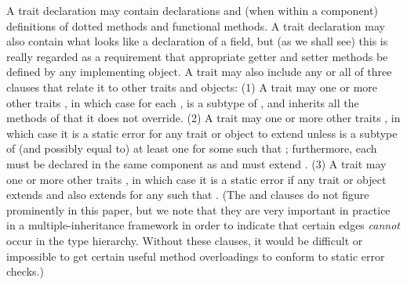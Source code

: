 A trait declaration may contain declarations and (when within a component) definitions
of dotted methods and functional methods.  A trait declaration may also contain what looks
like a declaration of a field, but (as we shall see) this is really regarded as a requirement
that appropriate getter and setter methods be defined by any implementing object.
A trait may also include any or all of three clauses that relate it to other traits and objects:
(1) A trait  may  one or more other traits , in which case
for each ,  is a subtype of , and  inherits all the methods of  that it does not override.
(2) A trait  may  one or more other traits , in which case
it is a static error for any trait or object  to extend  unless  is a subtype of (and possibly equal to) at least one 
for some  such that ; furthermore, each  must be declared in the same component as 
and must extend .
(3) A trait  may  one or more other traits , in which case
it is a static error if any trait or object  extends  and also extends 
for any  such that .  (The  and  clauses do not figure
prominently in this paper, but we note that they are very important in practice in a
multiple-inheritance framework in order to indicate that certain edges \emph{cannot} occur
in the type hierarchy.  Without these clauses, it would be difficult or impossible to
get certain useful method overloadings to conform to static error checks.)


